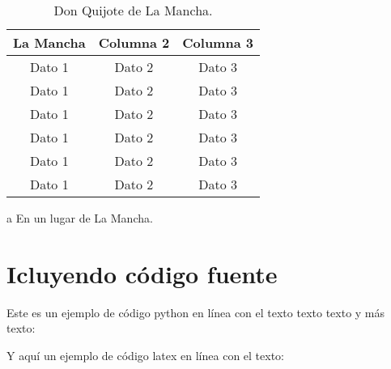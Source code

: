 \begin{table}[!ht]
  \caption{Don Quijote de La Mancha.}
  \centering
  \begin{threeparttable}
  \begin{tabular}{ccc}

  \toprule
  \textbf{La Mancha}\tnote{a} & \textbf{Columna 2} & \textbf{Columna 3}\\
  \midrule
  Dato 1             & Dato 2             & Dato 3\\
  Dato 1             & Dato 2             & Dato 3\\
  Dato 1             & Dato 2             & Dato 3\\
  Dato 1             & Dato 2             & Dato 3\\
  Dato 1             & Dato 2             & Dato 3\\
  Dato 1             & Dato 2             & Dato 3\\
  \bottomrule

  \end{tabular}
  \begin{tablenotes}
    \item[a] En un lugar de La Mancha.
  \end{tablenotes}
  \end{threeparttable}
  \label{tab:donquijote}
\end{table}


\section{Icluyendo código fuente}
Este es un ejemplo de código python en línea con el texto texto texto y más texto:


Y aquí un ejemplo de código latex en línea con el texto:

